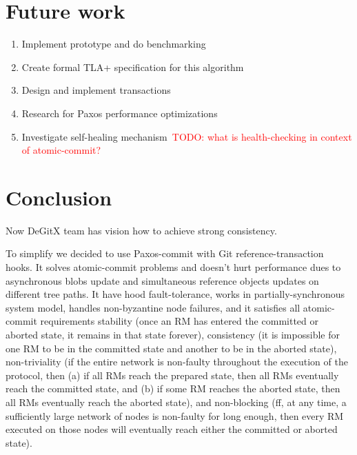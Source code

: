 \documentclass[sigplan, screen, nonacm, 11pt]{acmart}
\newcommand{\todo}[1]{\textcolor{red}{TODO: #1}}
\begin{document}
\section{Future work}

\begin{enumerate}
  \item Implement prototype and do benchmarking
  \item Create formal TLA+ specification for this algorithm
  \item Design and implement transactions
  \item Research for Paxos performance optimizations
  \item Investigate self-healing mechanism~\todo{what is health-checking in context of atomic-commit?}
\end{enumerate}

\section{Conclusion}

Now DeGitX team has vision how to achieve strong consistency.

To simplify we decided to use Paxos-commit with Git reference-transaction hooks.
It solves atomic-commit problems and doesn't hurt performance dues to asynchronous blobs update
and simultaneous reference objects updates on different tree paths.
It have hood fault-tolerance, works in partially-synchronous system model,
handles non-byzantine node failures, and it satisfies all atomic-commit requirements
stability (once an RM has entered the committed or aborted state, it remains in that state forever),
consistency (it is impossible for one RM to be in the committed state and another to be in
the aborted state),
non-triviality (if the entire network is non-faulty throughout the execution of the protocol,
then (a) if all RMs reach the prepared state, then all RMs eventually reach the committed state,
and (b) if some RM reaches the aborted state,  then all RMs eventually reach the aborted state),
and non-blocking (ff, at any time, a sufficiently large network of nodes is non-faulty for long enough,
then every RM executed on those nodes will eventually reach either the committed or aborted state).

\newpage



\end{document}
